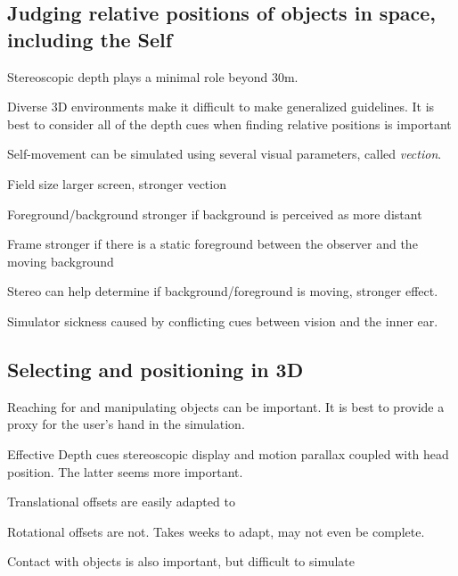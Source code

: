 \begin{mdframed}
\subsection{Judging relative positions of objects in space, including the Self}
\begin{multicols}{2}
\begin{compactdesc}
\item[Stereoscopic depth] plays a minimal role beyond 30m.
\item[Diverse] 3D environments make it difficult to make generalized
    guidelines. It is best to consider all of the depth cues when finding
    relative positions is important
\item[Self-movement] can be simulated using several visual parameters, called
    \emph{vection}.
    \begin{compactdesc}
    \item[Field size] larger screen, stronger vection
    \item[Foreground/background] stronger if background is perceived as more
        distant
    \item[Frame] stronger if there is a static foreground between the
        observer and the moving background
    \item[Stereo] can help determine if background/foreground is moving,
        stronger effect.
    \end{compactdesc}
\item[Simulator sickness] caused by conflicting cues between vision and the
    inner ear.
\end{compactdesc}

\end{multicols}\end{mdframed}




\begin{mdframed}
\subsection{Selecting and positioning in 3D}
\begin{multicols}{2}
\begin{compactdesc}
\item[Reaching for and manipulating objects] can be important. It is best
    to provide a proxy for the user's hand in the simulation.
\item[Effective Depth cues] stereoscopic display and motion parallax
    coupled with head position. The latter seems more important.
\item[Translational offsets] are easily adapted to
\item[Rotational offsets] are not. Takes weeks to adapt, may not even be
    complete.
\item[Contact with objects] is also important, but difficult to simulate
\end{compactdesc}
\end{multicols}\end{mdframed}




